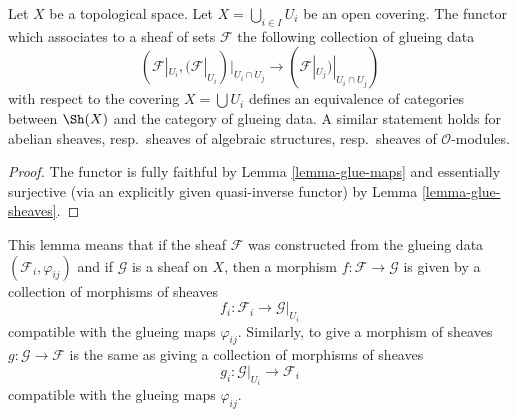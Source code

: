 \begin{lemma}
\label{lemma-mapping-property-glue}
Let $X$ be a topological space.
Let $X = \bigcup_{i\in I} U_i$ be an open covering.
The functor which associates to a sheaf of
sets $\mathcal{F}$ the following collection of
glueing data
$$
(\mathcal{F}|_{U_i},
(\mathcal{F}|_{U_i})|_{U_i \cap U_j}
\to
(\mathcal{F}|_{U_j})|_{U_i \cap U_j}
)
$$
with respect to the covering $X = \bigcup U_i$
defines an equivalence of categories between
$\Sh(X)$ and the category of glueing
data. A similar statement holds for
abelian sheaves, resp.\ sheaves of algebraic structures,
resp.\ sheaves of $\mathcal{O}$-modules.
\end{lemma}

\begin{proof}
The functor is fully faithful by
Lemma \ref{lemma-glue-maps}
and essentially surjective (via an explicitly given quasi-inverse functor) by
Lemma \ref{lemma-glue-sheaves}.
\end{proof}

\noindent
This lemma means that if the sheaf $\mathcal{F}$ was constructed
from the glueing data $(\mathcal{F}_i, \varphi_{ij})$
and if $\mathcal{G}$ is a sheaf on $X$, then a morphism
$f : \mathcal{F} \to \mathcal{G}$ is given by a collection of
morphisms of sheaves
$$
f_i : \mathcal{F}_i \longrightarrow \mathcal{G}|_{U_i}
$$
compatible with the glueing maps $\varphi_{ij}$. Similarly,
to give a morphism of sheaves $g : \mathcal{G} \to \mathcal{F}$
is the same as giving a collection of morphisms of sheaves
$$
g_i : \mathcal{G}|_{U_i} \longrightarrow \mathcal{F}_i
$$
compatible with the glueing maps $\varphi_{ij}$.










